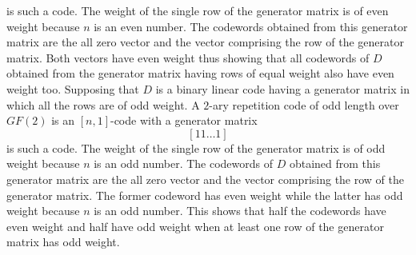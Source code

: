 is such a code. The weight of the single row of the generator matrix is of even weight because $n$ is an even number. The codewords obtained from this generator matrix are the all zero vector and the vector comprising the row of the generator matrix.  Both vectors have even weight thus showing that all codewords of $D$ obtained from the generator matrix having rows of equal weight also have even weight too.
\qsubpart
Supposing that $D$ is a binary linear code having a generator matrix
in which all the rows are of odd weight. A $2$-ary repetition code of odd length over $GF(2)$ is an $[n,1]$-code with a generator matrix
\[
	\left[11\ldots1\right]
\]
is such a code. The weight of the single row of the generator matrix is of odd weight because $n$ is an odd number. The codewords of $D$ obtained from this generator matrix are the all zero vector and the vector comprising the row of the generator matrix.  The former codeword has even weight while the latter has odd weight because $n$ is an odd number.  This shows that half the codewords have even weight and half have odd weight when at least one row of the generator matrix has odd weight.